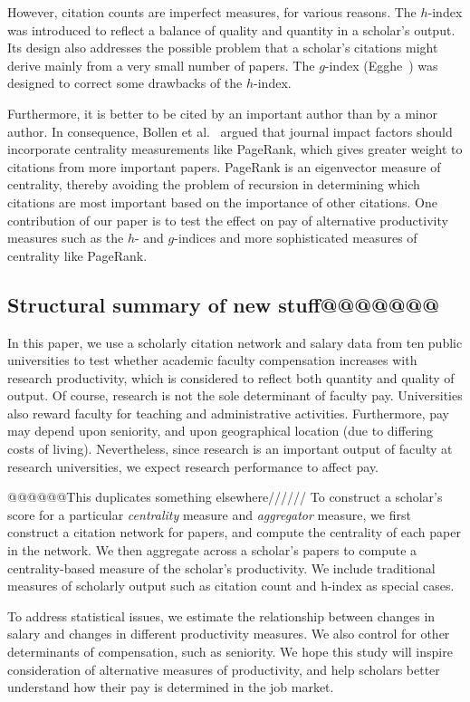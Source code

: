 However, citation counts are imperfect measures, for various reasons. The $h$-index was introduced to reflect a balance of quality and quantity in a scholar’s output. Its design also addresses the possible problem that a scholar’s citations might derive mainly from a very small number of papers. The $g$-index  (Egghe~\cite{egghe2006Gindex}) was designed to correct some drawbacks of the $h$-index.  

Furthermore, it is better to be cited by an important author than by a minor author. In consequence, Bollen et al.~\cite{bollen2006} argued that journal impact factors should incorporate centrality measurements like PageRank, which gives greater weight to citations from more important papers. PageRank is an eigenvector measure of centrality, thereby avoiding the problem of recursion in determining which citations are most important based on the importance of other citations. One contribution of our paper is to test the effect on pay of alternative productivity measures such as the $h$- and $g$-indices and more sophisticated measures of centrality like PageRank.

\subsection{Structural summary of new stuff@@@@@@@}
In this paper, we use a scholarly citation network and salary data from ten public universities to test whether academic faculty compensation increases with research productivity, which is considered to reflect both quantity and quality of output. Of course, research is not the sole determinant of faculty pay. Universities also reward faculty for teaching and administrative activities. Furthermore, pay may depend upon seniority, and upon geographical location (due to differing costs of living). Nevertheless, since research is an important output of faculty at research universities, we expect research performance to affect pay.

@@@@@@This duplicates something elsewhere//////
To construct a scholar’s score for a particular \emph{centrality} measure and \emph{aggregator} measure, we first construct a citation network for papers, and compute the centrality of each paper in the network. We then aggregate across a scholar’s papers to compute a centrality-based measure of the scholar’s productivity. We include traditional measures of scholarly output such as citation count and h-index as special cases. 

To address statistical issues, we estimate the relationship between changes in salary and changes in different productivity measures. We also control for other determinants of compensation, such as seniority. We hope this study will inspire consideration of alternative measures of productivity, and help scholars better understand how their pay is determined in the job market.

